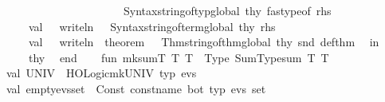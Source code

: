 \begin{isabellebody}
\ \ \ \ \ \ \ \ \ \ \ \ \ \ \ \ \ \ \ \ \ Syntax{\isachardot}{\kern0pt}string{\isacharunderscore}{\kern0pt}of{\isacharunderscore}{\kern0pt}typ{\isacharunderscore}{\kern0pt}global\ thy{\isacharprime}{\kern0pt}\ {\isacharparenleft}{\kern0pt}fastype{\isacharunderscore}{\kern0pt}of\ rhs{\isacharparenright}{\kern0pt}{\isacharparenright}{\kern0pt}\isanewline
\ \ \ \ val\ {\isacharunderscore}{\kern0pt}\ {\isacharequal}{\kern0pt}\ writeln\ {\isacharparenleft}{\kern0pt}{\isachardoublequote}{\kern0pt}{\isachardoublequote}{\kern0pt}\ {\isacharcircum}{\kern0pt}\ Syntax{\isachardot}{\kern0pt}string{\isacharunderscore}{\kern0pt}of{\isacharunderscore}{\kern0pt}term{\isacharunderscore}{\kern0pt}global\ thy{\isacharprime}{\kern0pt}\ rhs{\isacharparenright}{\kern0pt}\isanewline
\ \ \ \ val\ {\isacharunderscore}{\kern0pt}\ {\isacharequal}{\kern0pt}\ writeln\ {\isacharparenleft}{\kern0pt}{\isachardoublequote}{\kern0pt}\ theorem{\isacharcolon}{\kern0pt}\ {\isachardoublequote}{\kern0pt}\ {\isacharcircum}{\kern0pt}\ Thm{\isachardot}{\kern0pt}string{\isacharunderscore}{\kern0pt}of{\isacharunderscore}{\kern0pt}thm{\isacharunderscore}{\kern0pt}global\ thy{\isacharprime}{\kern0pt}\ {\isacharparenleft}{\kern0pt}snd\ def{\isacharunderscore}{\kern0pt}thm{\isacharparenright}{\kern0pt}{\isacharparenright}{\kern0pt}\isanewline
\ \ in\isanewline
\ \ \ \ thy{\isacharprime}{\kern0pt}\isanewline
\ \ end\isanewline
{\isacartoucheclose}%
\endisatagML
{\isafoldML}%
%
\isadelimML
%
\endisadelimML
%
\isadelimdocument
%
\endisadelimdocument
%
\isatagdocument
%
\isamarkuptrue%
%
\endisatagdocument
{\isafolddocument}%
%
\isadelimdocument
%
\endisadelimdocument
%
\isadelimML
%
\endisadelimML
%
\isatagML
{}\isamarkupfalse%
{\isacartoucheopen}\ \ \ \isanewline
fun\ mk{\isacharunderscore}{\kern0pt}sumT\ {\isacharparenleft}{\kern0pt}T{}{\isacharcomma}{\kern0pt}\ T{}{\isacharparenright}{\kern0pt}\ {\isacharequal}{\kern0pt}\ Type\ {\isacharparenleft}{\kern0pt}{\isachardoublequote}{\kern0pt}Sum{\isacharunderscore}{\kern0pt}Type{\isachardot}{\kern0pt}sum{\isachardoublequote}{\kern0pt}{\isacharcomma}{\kern0pt}\ {\isacharbrackleft}{\kern0pt}T{}{\isacharcomma}{\kern0pt}\ T{}{\isacharbrackright}{\kern0pt}{\isacharparenright}{\kern0pt}\isanewline
\isanewline
val\ UNIV{\isacharunderscore}{\kern0pt}\ {\isacharequal}{\kern0pt}\ HOLogic{\isachardot}{\kern0pt}mk{\isacharunderscore}{\kern0pt}UNIV\ {\isacharat}{\kern0pt}{\isacharbraceleft}{\kern0pt}typ\ evs{\isacharbraceright}{\kern0pt}\isanewline
val\ empty{\isacharunderscore}{\kern0pt}evs{\isacharunderscore}{\kern0pt}set\ {\isacharequal}{\kern0pt}\ Const\ {\isacharparenleft}{\kern0pt}{\isacharat}{\kern0pt}{\isacharbraceleft}{\kern0pt}const{\isacharunderscore}{\kern0pt}name\ bot{\isacharbraceright}{\kern0pt}{\isacharcomma}{\kern0pt}\ {\isacharat}{\kern0pt}{\isacharbraceleft}{\kern0pt}typ\ {\isachardoublequote}{\kern0pt}evs\ set{\isachardoublequote}{\kern0pt}{\isacharbraceright}{\kern0pt}{\isacharparenright}{\kern0pt}\isanewline

\end{isabellebody}
